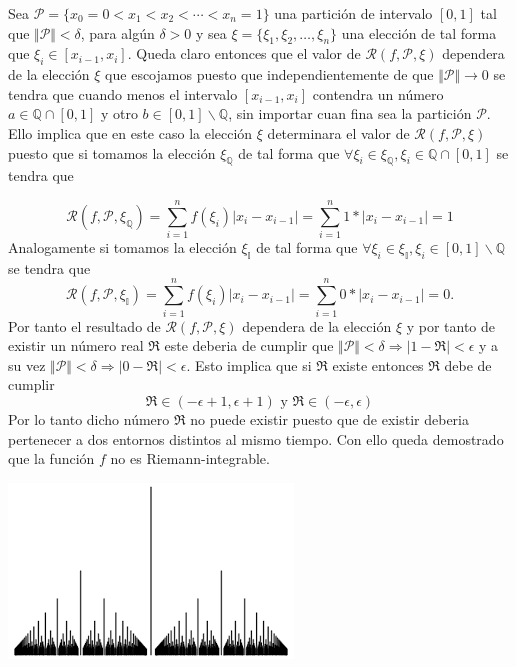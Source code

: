 \documentclass[a4paper,12pt]{article}
\begin{document}
\newpage
Sea $\mathcal{P} = \lbrace x_0 = 0 < x_1 < x_2 < \cdots < x_n = 1\rbrace$ una partición de intervalo $[0,1]$ tal que
$\Vert \mathcal{P} \Vert < \delta$, para algún $\delta > 0$ y sea $\xi = \lbrace \xi_1,\xi_2,\ldots,\xi_n\rbrace$ una
elección de tal forma que $\xi_i \in [x_{i-1} , x_i]$. Queda claro entonces que el valor de
$\mathcal{R} (f,\mathcal{P},\xi)$ dependera de la elección $\xi$ que escojamos puesto que independientemente de que
$\Vert \mathcal{P}\Vert \rightarrow 0 $ se tendra que cuando menos el intervalo $[x_{i-1},x_i]$ contendra un número
$a \in \mathbb{Q} \cap [0,1]$ y otro $b \in [0,1]\backslash \mathbb{Q}$, sin importar cuan fina sea la partición $\mathcal{P}$.
Ello implica que en este caso la elección $\xi$ determinara el valor de $\mathcal{R} (f,\mathcal{P},\xi)$ puesto que si
tomamos la elección $\xi_{\mathbb{Q}}$ de tal forma que $\forall \xi_i \in \xi_{\mathbb{Q}}, \xi_i \in  \mathbb{Q} \cap [0,1]$
se tendra que

\[\mathcal{R} (f,\mathcal{P},\xi_{\mathbb{Q}}) = \sum_{i = 1}^{n} f(\xi_i)|x_{i} - x_{i-1}| =  \sum_{i = 1}^{n} 1*|x_{i} - x_{i-1}| = 1 \]
Analogamente si tomamos la elección $\xi_{\mathbb{I}}$ de tal forma que
$\forall \xi_i \in \xi_{\mathbb{I}}, \xi_i \in  [0,1] \backslash \mathbb{Q}$ se tendra que
\[\mathcal{R} (f,\mathcal{P},\xi_{\mathbb{I}}) = \sum_{i = 1}^{n} f(\xi_i)|x_{i} - x_{i-1}| =  \sum_{i = 1}^{n} 0*|x_{i} - x_{i-1}| = 0. \]
Por tanto el resultado de $\mathcal{R} (f,\mathcal{P},\xi)$ dependera de la elección $\xi$  y por tanto de existir un número real
$\mathfrak{R}$ este deberia de cumplir que $\Vert \mathcal{P} \Vert  <\delta \Rightarrow \vert 1 - \mathfrak{R} \vert < \epsilon $
y a su vez $\Vert \mathcal{P} \Vert  <\delta \Rightarrow \vert 0 - \mathfrak{R} \vert < \epsilon $. Esto implica que si $\mathfrak{R}$
existe entonces $\mathfrak{R} $ debe de cumplir
\[\mathfrak{R} \in (-\epsilon+1, \epsilon +1 ) \text{ y } \mathfrak{R} \in (-\epsilon, \epsilon)\]
Por lo tanto dicho número $\mathfrak{R} $ no puede existir puesto que de existir deberia pertenecer a dos entornos distintos
al mismo tiempo. Con ello queda demostrado que la función $f$ no es Riemann-integrable.\\
\begin{center}
    \includegraphics[scale=0.5]{dirichlet.png}
\end{center}
\end{document}
